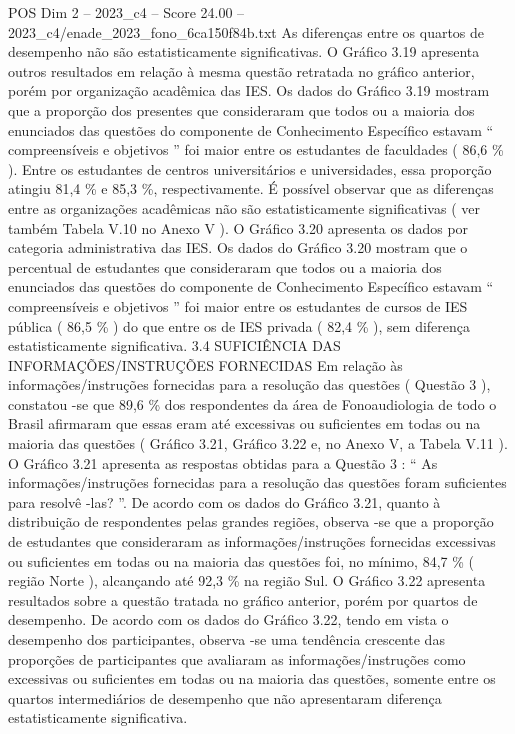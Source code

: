 \begin{textsample}{POS Dim 2 – 2023\_c4 – Score 24.00 – 2023\_c4/enade\_2023\_fono\_6ca150f84b.txt}
As diferenças entre os quartos de desempenho não são estatisticamente significativas.
O Gráfico 3.19 apresenta outros resultados em relação à mesma questão retratada no gráfico anterior, porém por organização acadêmica das IES.
Os dados do Gráfico 3.19 mostram que a proporção dos presentes que consideraram que todos ou a maioria dos enunciados das questões do componente de Conhecimento Específico estavam “ compreensíveis e objetivos ” foi maior entre os estudantes de faculdades ( 86,6 \% ).
Entre os estudantes de centros universitários e universidades, essa proporção atingiu 81,4 \% e 85,3 \%, respectivamente.
É possível observar que as diferenças entre as organizações acadêmicas não são estatisticamente significativas ( ver também Tabela V.10 no Anexo V ).
O Gráfico 3.20 apresenta os dados por categoria administrativa das IES.
Os dados do Gráfico 3.20 mostram que o percentual de estudantes que consideraram que todos ou a maioria dos enunciados das questões do componente de Conhecimento Específico estavam “ compreensíveis e objetivos ” foi maior entre os estudantes de cursos de IES pública ( 86,5 \% ) do que entre os de IES privada ( 82,4 \% ), sem diferença estatisticamente significativa. 3.4 SUFICIÊNCIA DAS INFORMAÇÕES/INSTRUÇÕES FORNECIDAS Em relação às informações/instruções fornecidas para a resolução das questões ( Questão 3 ), constatou -se que 89,6 \% dos respondentes da área de Fonoaudiologia de todo o Brasil afirmaram que essas eram até excessivas ou suficientes em todas ou na maioria das questões ( Gráfico 3.21, Gráfico 3.22 e, no Anexo V, a Tabela V.11 ).
O Gráfico 3.21 apresenta as respostas obtidas para a Questão 3 : “ As informações/instruções fornecidas para a resolução das questões foram suficientes para resolvê -las? ”.
De acordo com os dados do Gráfico 3.21, quanto à distribuição de respondentes pelas grandes regiões, observa -se que a proporção de estudantes que consideraram as informações/instruções fornecidas excessivas ou suficientes em todas ou na maioria das questões foi, no mínimo, 84,7 \% ( região Norte ), alcançando até 92,3 \% na região Sul.
O Gráfico 3.22 apresenta resultados sobre a questão tratada no gráfico anterior, porém por quartos de desempenho.
De acordo com os dados do Gráfico 3.22, tendo em vista o desempenho dos participantes, observa -se uma tendência crescente das proporções de participantes que avaliaram as informações/instruções como excessivas ou suficientes em todas ou na maioria das questões, somente entre os quartos intermediários de desempenho que não apresentaram diferença estatisticamente significativa.

\end{textsample}
